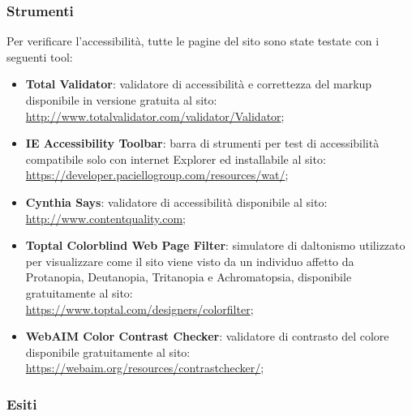 \documentclass[12pt]{article}
\begin{document}
	\subsubsection{Strumenti}
	
	Per verificare l'accessibilità, tutte le pagine del sito sono state testate con i seguenti tool:
	
	\begin{itemize}
		\item \textbf{Total Validator}: validatore di accessibilità e correttezza del markup disponibile in versione gratuita al sito:
		\\ \url{http://www.totalvalidator.com/validator/Validator};
		
		\item \textbf{IE Accessibility Toolbar}: barra di strumenti per test di accessibilità compatibile solo con internet Explorer ed installabile al sito:
		\\ \url{https://developer.paciellogroup.com/resources/wat/};
		
		\item \textbf{Cynthia Says}: validatore di accessibilità disponibile al sito: 
		\\ \url{http://www.contentquality.com};
		
		\item \textbf{Toptal Colorblind Web Page Filter}: simulatore di daltonismo utilizzato per visualizzare come il sito viene visto da un individuo affetto da Protanopia, Deutanopia, Tritanopia e Achromatopsia, disponibile gratuitamente al sito: 
		\\ \url{https://www.toptal.com/designers/colorfilter};
		
		\item \textbf{WebAIM Color Contrast Checker}: validatore di contrasto del colore disponibile gratuitamente al sito: 
		\\ \url{https://webaim.org/resources/contrastchecker/};
	\end{itemize}
	
	\subsubsection{Esiti}
	
\end{document}
